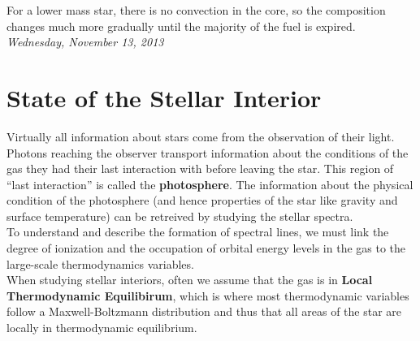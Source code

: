 \documentclass[10pt]{article}
\numberwithin{equation}{section}
\newcommand{\n}{\noindent}
\begin{document}
    \n For a lower mass star, there is no convection in the core, so
    the composition changes much more gradually until the majority of
    the fuel is expired.\\

    \n \textit{Wednesday, November 13, 2013}

    \section{State of the Stellar Interior}
    \label{sec:state-stell-inter}

    Virtually all information about stars come from the observation of
    their light. Photons reaching the observer transport information
    about the conditions of the gas they had their last interaction
    with before leaving the star. This region of ``last interaction''
    is called the \textbf{photosphere}. The information about the
    physical condition of the photosphere (and hence properties of the
    star like gravity and surface temperature) can be retreived by
    studying the stellar spectra.\\

    \n To understand and describe the formation of spectral lines, we
    must link the degree of ionization and the occupation of orbital
    energy levels in the gas to the large-scale thermodynamics
    variables. \\

    \n When studying stellar interiors, often we assume that the gas is
    in \textbf{Local Thermodynamic Equilibirum}, which is where most
    thermodynamic variables follow a Maxwell-Boltzmann distribution
    and thus that all areas of the star are locally in thermodynamic
    equilibrium.
    
\end{document}

